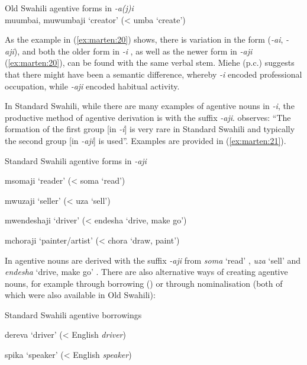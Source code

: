 \documentclass[output=paper]{langscibook}
\begin{document}
\ea\label{ex:marten:20}Old Swahili agentive forms in \textit{{}-a(j)i} \citep[78]{Miehe1979}\\
muumbai, muwumbaji     ‘creator’ (< umba ‘create’)
\z


As the example in (\ref{ex:marten:20}) shows, there is variation in the form (\textit{{}-ai}, \textit{{}-aji}), and both the older form in \textit{{}-i} , as well as the newer form in \textit{{}-aji} (\ref{ex:marten:20}), can be found with the same verbal stem. Miehe (p.c.) suggests that there might have been a semantic difference, whereby \textit{{}-i} encoded professional occupation, while \textit{{}-aji} encoded habitual activity. 

  In Standard Swahili, while there are many examples of agentive nouns in \textit{{}-i}, the productive method of agentive derivation is with the suffix \textit{{}-aji}. \citet[79]{Miehe1979} observes: ``The formation of the first group [in \textit{{}-i}] is very rare in Standard Swahili and typically the second group [in \textit{{}-aji}] is used''. Examples are provided in (\ref{ex:marten:21}).

\ea\label{ex:marten:21}Standard Swahili agentive forms in \textit{{}-aji}

    \ea\label{ex:marten:21a}  msomaji          ‘reader’ (< soma ‘read’) 
    
    \ex\label{ex:marten:21b}  mwuzaji          ‘seller’ (< uza ‘sell’)

    \ex\label{ex:marten:21c}  mwendeshaji      ‘driver’ (< endesha ‘drive, make go’)

    \ex\label{ex:marten:21d}  mchoraji        ‘painter/artist’ (< chora ‘draw, paint’)
    \z
\z

In  agentive nouns are derived with the suffix \textit{{}-aji} from \textit{{}soma} ‘read’ , \textit{{}uza} ‘sell’  and \textit{{}endesha} ‘drive, make go’ . There are also alternative ways of creating agentive nouns, for example through borrowing  (\citealt{Krumm1940, Lodhi2000, Zawawi1979}) or through nominalisation  (both of which were also available in Old Swahili):


\ea\label{ex:marten:22}
Standard Swahili agentive borrowings

    \ea\label{ex:marten:22a}  dereva      ‘driver’ (< English \textit{driver})

    \ex\label{ex:marten:22b}  spika        ‘speaker’ (< English \textit{speaker})
\end{document}
